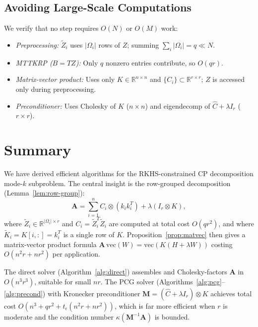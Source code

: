 \documentclass[12pt]{article}
\theoremstyle{definition}
\begin{document}
\subsection{Avoiding Large-Scale Computations}

We verify that no step requires $O(N)$ or $O(M)$ work:
\begin{itemize}
\item \textit{Preprocessing:} $\tilde{Z}_i$ uses $|\Omega_i|$ rows of $Z$; summing $\sum_i |\Omega_i| = q \ll N$.
\item \textit{MTTKRP ($B = TZ$):} Only $q$ nonzero entries contribute, so $O(qr)$.
\item \textit{Matrix-vector product:} Uses only $K \in \mathbb{R}^{n\times n}$ and $\{C_i\} \subset \mathbb{R}^{r\times r}$; $Z$ is accessed only during preprocessing.
\item \textit{Preconditioner:} Uses Cholesky of $K$ ($n\times n$) and eigendecomp of $\hat{C}+\lambda I_r$ ($r\times r$).
\end{itemize}

\section{Summary}\label{sec:summary}

We have derived efficient algorithms for the RKHS-constrained CP decomposition mode-$k$ subproblem. The central insight is the row-grouped decomposition (Lemma~\ref{lem:row-group}):
\[
\mathbf{A} = \sum_{i=1}^n C_i \otimes (k_ik_i^T) + \lambda(I_r \otimes K),
\]
where $\tilde{Z}_i \in \mathbb{R}^{|\Omega_i|\times r}$ and $C_i = \tilde{Z}_i^T\tilde{Z}_i$ are computed at total cost $O(qr^2)$, and where $\tilde{K}_i = K[i,:] = k_i^T$ is a single row of $K$. Proposition~\ref{prop:matvec} then gives a matrix-vector product formula $\mathbf{A}\,\mathrm{vec}(W) = \mathrm{vec}(K(H+\lambda W))$ costing $O(n^2r + nr^2)$ per application.

The direct solver (Algorithm~\ref{alg:direct}) assembles and Cholesky-factors $\mathbf{A}$ in $O(n^3r^3)$, suitable for small $nr$. The PCG solver (Algorithms~\ref{alg:pcg}--\ref{alg:precond}) with Kronecker preconditioner $\mathbf{M} = (\hat{C}+\lambda I_r)\otimes K$ achieves total cost $O(n^3 + qr^2 + t_\epsilon(n^2r+nr^2))$, which is far more efficient when $r$ is moderate and the condition number $\kappa(\mathbf{M}^{-1}\mathbf{A})$ is bounded.
\end{document}
